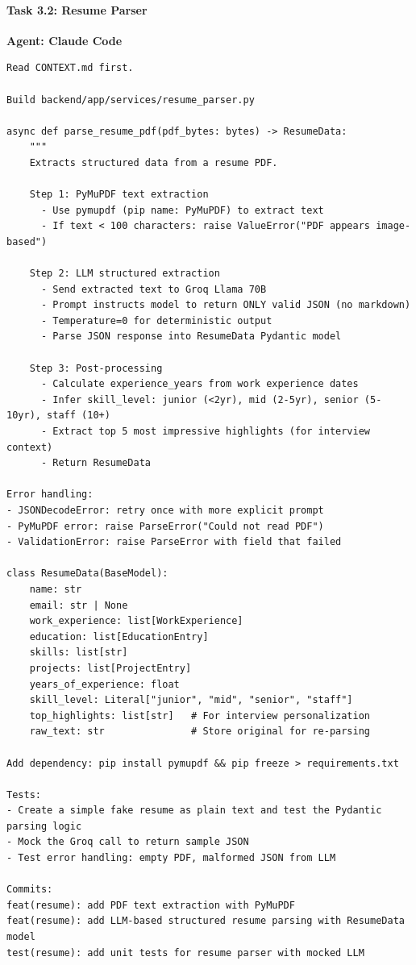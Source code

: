 \documentclass[
  11pt,
]{article}
\begin{document}
\hypertarget{task-3.2-resume-parser}{%
\paragraph{Task 3.2: Resume Parser}\label{task-3.2-resume-parser}}

\textbf{Agent: Claude Code}

\begin{lstlisting}
Read CONTEXT.md first.

Build backend/app/services/resume_parser.py

async def parse_resume_pdf(pdf_bytes: bytes) -> ResumeData:
    """
    Extracts structured data from a resume PDF.

    Step 1: PyMuPDF text extraction
      - Use pymupdf (pip name: PyMuPDF) to extract text
      - If text < 100 characters: raise ValueError("PDF appears image-based")

    Step 2: LLM structured extraction
      - Send extracted text to Groq Llama 70B
      - Prompt instructs model to return ONLY valid JSON (no markdown)
      - Temperature=0 for deterministic output
      - Parse JSON response into ResumeData Pydantic model

    Step 3: Post-processing
      - Calculate experience_years from work experience dates
      - Infer skill_level: junior (<2yr), mid (2-5yr), senior (5-10yr), staff (10+)
      - Extract top 5 most impressive highlights (for interview context)
      - Return ResumeData

Error handling:
- JSONDecodeError: retry once with more explicit prompt
- PyMuPDF error: raise ParseError("Could not read PDF")
- ValidationError: raise ParseError with field that failed

class ResumeData(BaseModel):
    name: str
    email: str | None
    work_experience: list[WorkExperience]
    education: list[EducationEntry]
    skills: list[str]
    projects: list[ProjectEntry]
    years_of_experience: float
    skill_level: Literal["junior", "mid", "senior", "staff"]
    top_highlights: list[str]   # For interview personalization
    raw_text: str               # Store original for re-parsing

Add dependency: pip install pymupdf && pip freeze > requirements.txt

Tests:
- Create a simple fake resume as plain text and test the Pydantic parsing logic
- Mock the Groq call to return sample JSON
- Test error handling: empty PDF, malformed JSON from LLM

Commits:
feat(resume): add PDF text extraction with PyMuPDF
feat(resume): add LLM-based structured resume parsing with ResumeData model
test(resume): add unit tests for resume parser with mocked LLM
\end{lstlisting}
\end{document}
